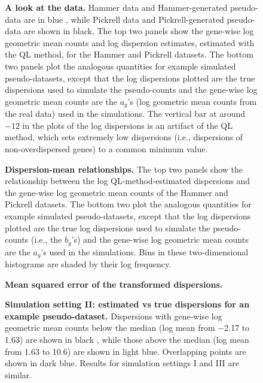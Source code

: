 \documentclass[10pt]{article}
\begin{document}
\begin{figure}[!ht]
   \centering
   \caption{{\bf A look at the data.} Hammer data and Hammer-generated pseudo-data are in blue %
   , while Pickrell data and Pickrell-generated pseudo-data are shown in black. %
    The top two panels show the gene-wise log geometric mean counts and log dispersion estimates, estimated with the QL method, for the Hammer and Pickrell datasets. The bottom two panels plot the analogous quantities for example simulated pseudo-datasets, except that the log dispersions plotted are the true dispersions used to simulate the pseudo-counts and the gene-wise log geometric mean counts are the $a_g$'s (log geometric mean counts from the real data) used in the simulations. The vertical bar at around $-12$ in the plots of the log dispersions is an artifact of the QL method, which sets  extremely low dispersions (i.e., dispersions of non-overdispersed genes) to a common minimum value.}
   \label{fig:hists}
\end{figure}

\begin{figure}[!ht]
   \centering
   \caption{{\bf Dispersion-mean relationships.} The top two panels show the relationship between the log QL-method-estimated dispersions and the gene-wise log geometric mean counts of the Hammer and Pickrell datasets. The bottom two plot the analogous quantities for example simulated pseudo-datasets, except that the log dispersions plotted are the true log dispersions used to simulate the pseudo-counts (i.e., the $b_g$'s) and the gene-wise log geometric mean counts are the $a_g$'s used in the simulations. Bins in these two-dimensional histograms are shaded by their log frequency.}
   \label{fig:meandispscatter}
\end{figure}

\begin{figure}[!ht] %
   \centering
   \caption{{\bf Mean squared error of the transformed dispersions.}}
   \label{fig:mse}
\end{figure}

\begin{figure}[!ht] %
   \centering
   \caption{{\bf \color{blue} Simulation setting II: estimated vs true dispersions for an example pseudo-dataset.} \color{blue} Dispersions with gene-wise log geometric mean counts below the median (log mean from $-$2.17 to 1.63) are shown in black %
   , while those above the median (log mean from 1.63 to 10.6) are shown in light blue. %
   Overlapping points are shown in dark blue. %
   Results for simulation settings I and III are similar. }
   \label{fig:pp2}
\end{figure}
\end{document}
